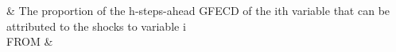 \documentclass[
  letterpaper,
  DIV=11,
  numbers=noendperiod]{scrartcl}
\begin{document}
\begin{longtable}[]
                                                                                                                                                                                                                                                                                                                                                                                                                                                                                                                                                                                                                                                                                                                                                                                                                                                                                                                                                                                                                                                                                                              \)
& The proportion of the h-steps-ahead GFECD of the ith variable that can
be attributed to the shocks to variable i \\
FROM &

\end{longtable}
\end{document}
